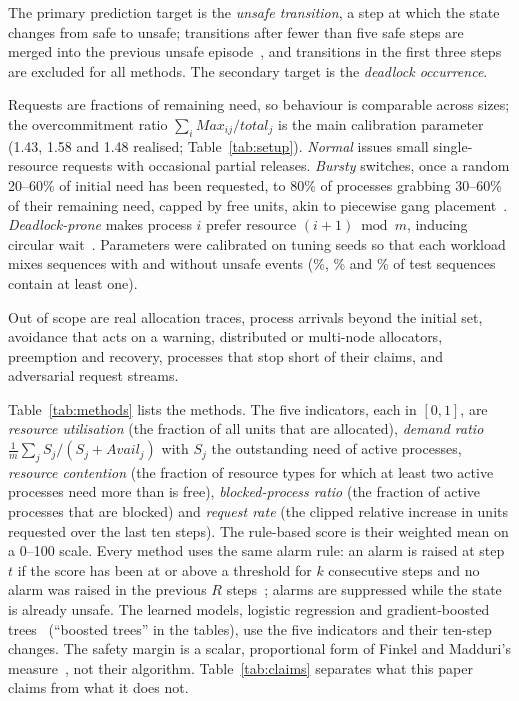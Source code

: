\documentclass[conference]{IEEEtran}
\begin{document}
The primary prediction target is the \emph{unsafe transition}, a step at which the state changes from safe to unsafe; transitions after fewer than five safe steps are merged into the previous unsafe episode~\cite{Tatbul2018}, and transitions in the first three steps are excluded for all methods. The secondary target is the \emph{deadlock occurrence}.

Requests are fractions of remaining need, so behaviour is comparable across sizes; the overcommitment ratio $\sum_i\mathit{Max}_{ij}/\mathit{total}_j$ is the main calibration parameter (1.43, 1.58 and 1.48 realised; Table~\ref{tab:setup}). \textit{Normal} issues small single-resource requests with occasional partial releases. \textit{Bursty} switches, once a random 20--60\% of initial need has been requested, to 80\% of processes grabbing 30--60\% of their remaining need, capped by free units, akin to piecewise gang placement~\cite{Jayaram2019FfDL}. \textit{Deadlock-prone} makes process $i$ prefer resource $(i{+}1)\bmod m$, inducing circular wait~\cite{Coffman1971}. Parameters were calibrated on tuning seeds so that each workload mixes sequences with and without unsafe events (\WithEventNormal\%, \WithEventSpike\% and \WithEventDlp\% of test sequences contain at least one).

Out of scope are real allocation traces, process arrivals beyond the initial set, avoidance that acts on a warning, distributed or multi-node allocators, preemption and recovery, processes that stop short of their claims, and adversarial request streams.

Table~\ref{tab:methods} lists the methods. The five indicators, each in $[0,1]$, are \emph{resource utilisation} (the fraction of all units that are allocated), \emph{demand ratio} $\frac{1}{m}\sum_j S_j/(S_j+\mathit{Avail}_j)$ with $S_j$ the outstanding need of active processes, \emph{resource contention} (the fraction of resource types for which at least two active processes need more than is free), \emph{blocked-process ratio} (the fraction of active processes that are blocked) and \emph{request rate} (the clipped relative increase in units requested over the last ten steps). The rule-based score is their weighted mean on a 0--100 scale. Every method uses the same alarm rule: an alarm is raised at step $t$ if the score has been at or above a threshold for $k$ consecutive steps and no alarm was raised in the previous $R$ steps~\cite{Hyland2020}; alarms are suppressed while the state is already unsafe. The learned models, logistic regression and gradient-boosted trees~\cite{Friedman2001} (``boosted trees'' in the tables), use the five indicators and their ten-step changes. The safety margin is a scalar, proportional form of Finkel and Madduri's measure~\cite{Finkel1987}, not their algorithm. Table~\ref{tab:claims} separates what this paper claims from what it does not.
\end{document}
